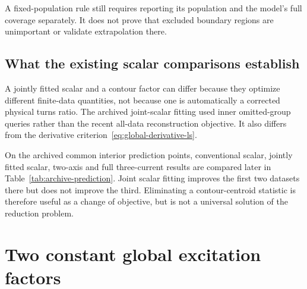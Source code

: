 A fixed-population rule still requires reporting its population and the model's full coverage separately. It does not prove that excluded boundary regions are unimportant or validate extrapolation there.

\subsection{What the existing scalar comparisons establish}
A jointly fitted scalar and a contour factor can differ because they optimize different finite-data quantities, not because one is automatically a corrected physical turns ratio. The archived joint-scalar fitting used inner omitted-group queries rather than the recent all-data reconstruction objective. It also differs from the derivative criterion~\eqref{eq:global-derivative-ls}.

On the archived common interior prediction points, conventional scalar, jointly fitted scalar, two-axis and full three-current results are compared later in Table~\ref{tab:archive-prediction}. Joint scalar fitting improves the first two datasets there but does not improve the third. Eliminating a contour-centroid statistic is therefore useful as a change of objective, but is not a universal solution of the reduction problem.

\section{Two constant global excitation factors}
